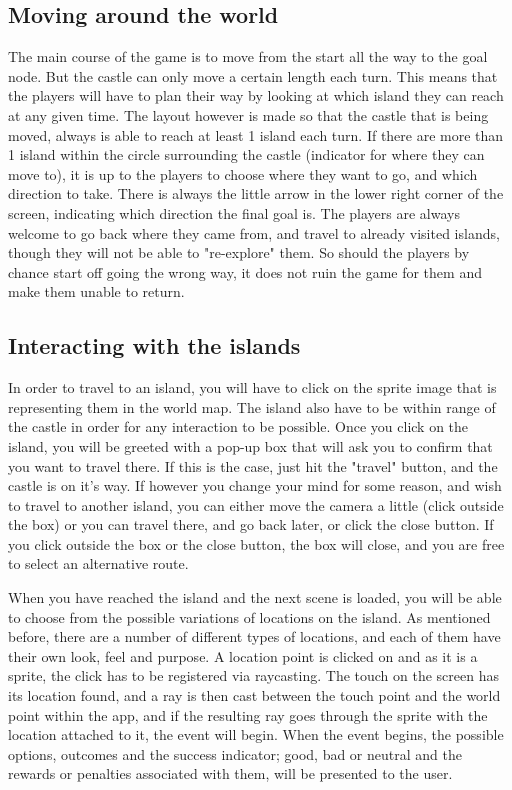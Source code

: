 \subsection{Moving around the world}
The main course of the game is to move from the start all the way to the goal node. But the castle can only move a certain length each turn. This means that the players will have to plan their way by looking at which island they can reach at any given time. The layout however is made so that the castle that is being moved, always is able to reach at least 1 island each turn. If there are more than 1 island within the circle surrounding the castle (indicator for where they can move to), it is up to the players to choose where they want to go, and which direction to take. There is always the little arrow in the lower right corner of the screen, indicating which direction the final goal is. The players are always welcome to go back where they came from, and travel to already visited islands, though they will not be able to "re-explore" them. So should the players by chance start off going the wrong way, it does not ruin the game for them and make them unable to return.

\subsection{Interacting with the islands}
In order to travel to an island, you will have to click on the sprite image that is representing them in the world map. The island also have to be within range of the castle in order for any interaction to be possible. 
Once you click on the island, you will be greeted with a pop-up box that will ask you to confirm that you want to travel there. If this is the case, just hit the "travel" button, and the castle is on it's way. If however you change your mind for some reason, and wish to travel to another island, you can either move the camera a little (click outside the box) or you can travel there, and go back later, or click the close button. If you click outside the box or the close button, the box will close, and you are free to select an alternative route.

When you have reached the island and the next scene is loaded, you will be able to choose from the possible variations of locations on the island. As mentioned before, there are a number of different types of locations, and each of them have their own look, feel and purpose.
A location point is clicked on and as it is a sprite, the click has to be registered via raycasting. The touch on the screen has its location found, and a ray is then cast between the touch point and the world point within the app, and if the resulting ray goes through the sprite with the location attached to it, the event will begin. When the event begins, the possible options, outcomes and the success indicator; good, bad or neutral and the rewards or penalties associated with them, will be presented to the user.

